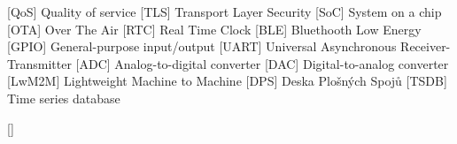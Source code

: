 \begin{acronym}[LoRaWAN]
            [QoS]
            {Quality of service}
            [TLS]
            {Transport Layer Security}
            [SoC]
            {System on a chip}
            [OTA]
            {Over The Air}
            [RTC]
            {Real Time Clock}
            [BLE]
            {Bluethooth Low Energy}
            [GPIO]
            {General-purpose input/output}
            [UART]
            {Universal Asynchronous Receiver-Transmitter}
            [ADC]
            {Analog-to-digital converter}
            [DAC]
            {Digital-to-analog converter}
            [LwM2M]
            {Lightweight Machine to Machine}
            [DPS]
            {Deska Plošných Spojů}
            [TSDB]
            {Time series database}

        
        
        \acro{}
            []
            {}
            
\end{acronym}
